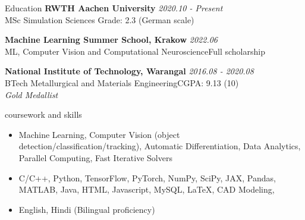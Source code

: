 \documentclass{resume} %
\begin{document}

\begin{rSection}{Education}
{\bf RWTH Aachen University} \hfill {\em 2020.10 - Present}\\
MSc Simulation Sciences \hfill {Grade: 2.3 (German scale)}

{\bf Machine Learning Summer School, Krakow} \hfill {\em 2022.06} \\
ML, Computer Vision and Computational Neuroscience\hfill {Full scholarship}

{\bf National Institute of Technology, Warangal} \hfill {\em 2016.08 - 2020.08} \\
BTech Metallurgical and Materials Engineering\hfill {CGPA: 9.13 (10)}\\
\emph{Gold Medallist}



\end{rSection}


\begin{rSection}{coursework and skills}
\begin{itemize}
  \item Machine Learning, Computer Vision (object detection/classification/tracking), Automatic Differentiation, Data Analytics, Parallel Computing, Fast Iterative Solvers
  \item C/C++, Python, TensorFlow, PyTorch, NumPy, SciPy, JAX, Pandas, MATLAB, Java, HTML, Javascript, MySQL, {\LaTeX}, CAD Modeling, 
  \item English, Hindi (Bilingual proficiency)
\end{itemize}
\end{rSection}
\end{document}
